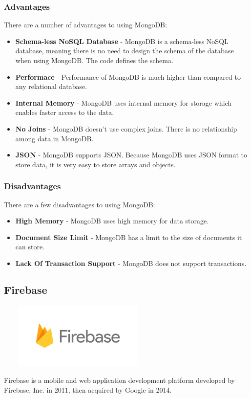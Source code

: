 \subsubsection{Advantages}
There are a number of advantages to using MongoDB:

\begin{itemize}
    \item \textbf{Schema-less NoSQL Database} - MongoDB is a schema-less NoSQL
    database, meaning there is no need to design the schema of the database when
    using MongoDB. The code defines the schema.
    \item \textbf{Performace} - Performance of MongoDB is much higher than
    compared to any relational database.
    \item \textbf{Internal Memory} - MongoDB uses internal memory for storage
    which enables faster access to the data.
    \item \textbf{No Joins} - MongoDB doesn't use complex joins. There is no
    relationship among data in MongoDB.
    \item \textbf{JSON} - MongoDB supports JSON. Because MongoDB uses JSON
    format to store data, it is very easy to store arrays and objects.
\end{itemize}

\subsubsection{Disadvantages}
There are a few disadvantages to using MongoDB:

\begin{itemize}
    \item \textbf{High Memory} - MongoDB uses high memory for data storage.
    \item \textbf{Document Size Limit} - MongoDB has a limit to the size of
    documents it can store.
    \item \textbf{Lack Of Transaction Support} - MongoDB does not support
    transactions.
\end{itemize}
\par
\medskip
\par
\medskip

\subsection{Firebase}
\par
\medskip
\begin{center}
    \includegraphics[width=8cm,height=3.3cm,keepaspectratio]{images/firebase}
\end{center}
Firebase is a mobile and web application development platform developed by Firebase, Inc. in 2011, then acquired by Google in 2014.